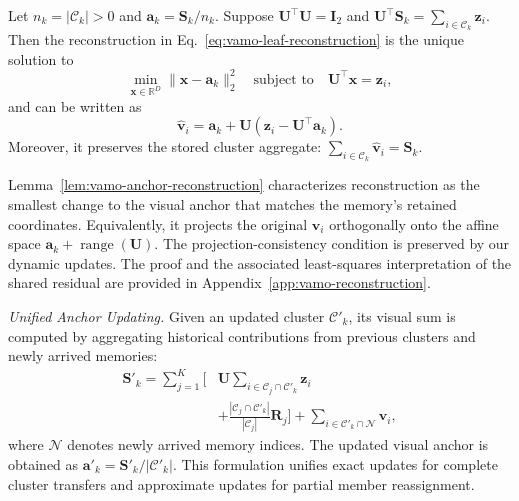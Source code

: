 \begin{lemma}
\label{lem:vamo-anchor-reconstruction}
Let $n_k=|\mathcal{C}_k|>0$ and
$\mathbf{a}_k=\mathbf{S}_k/n_k$.
Suppose $\mathbf{U}^{\top}\mathbf{U}=\mathbf{I}_2$ and
$\mathbf{U}^{\top}\mathbf{S}_k
=\sum_{i\in\mathcal{C}_k}\mathbf{z}_i$.
Then the reconstruction in
Eq.~\eqref{eq:vamo-leaf-reconstruction} is the unique solution to
\begin{equation}
\label{eq:vamo-constrained-reconstruction}
    \min_{\mathbf{x}\in\mathbb{R}^{D}}
    \|\mathbf{x}-\mathbf{a}_k\|_2^2
    \quad\text{subject to}\quad
    \mathbf{U}^{\top}\mathbf{x}=\mathbf{z}_i,
\end{equation}
and can be written as
\begin{equation}
\label{eq:vamo-anchor-correction}
    \hat{\mathbf{v}}_i
    =\mathbf{a}_k+
    \mathbf{U}(\mathbf{z}_i-\mathbf{U}^{\top}\mathbf{a}_k).
\end{equation}
Moreover, it preserves the stored cluster aggregate:
$\sum_{i\in\mathcal{C}_k}\hat{\mathbf{v}}_i=\mathbf{S}_k$.
\end{lemma}

Lemma~\ref{lem:vamo-anchor-reconstruction} characterizes reconstruction
as the smallest change to the visual anchor that matches the memory's
retained coordinates.
Equivalently, it projects the original $\mathbf{v}_i$ orthogonally
onto the affine space
$\mathbf{a}_k+\operatorname{range}(\mathbf{U})$.
The projection-consistency condition is preserved by our dynamic updates.
The proof and the associated least-squares interpretation of the shared
residual are provided in Appendix~\ref{app:vamo-reconstruction}.


\textit{Unified Anchor Updating.}
Given an updated cluster $\mathcal{C}'_k$, its visual sum is computed by aggregating historical contributions from previous clusters and newly arrived memories:
\begin{equation}
\label{eq:vamo-unified-update}
\begin{aligned}
\mathbf{S}'_k =
\sum_{j=1}^{K}
\Bigg[
&\mathbf{U}
\sum_{i\in\mathcal{C}_j\cap\mathcal{C}'_k}
\mathbf{z}_i \\
&+
\frac{|\mathcal{C}_j\cap\mathcal{C}'_k|}
{|\mathcal{C}_j|}
\mathbf{R}_j
\Bigg]
+
\sum_{i\in\mathcal{C}'_k\cap\mathcal{N}}
\mathbf{v}_i,
\end{aligned}
\end{equation}
where $\mathcal{N}$ denotes newly arrived memory indices.
The updated visual anchor is obtained as
$\mathbf{a}'_k=\mathbf{S}'_k/|\mathcal{C}'_k|$.
This formulation unifies exact updates for complete cluster transfers and approximate updates for partial member reassignment.



